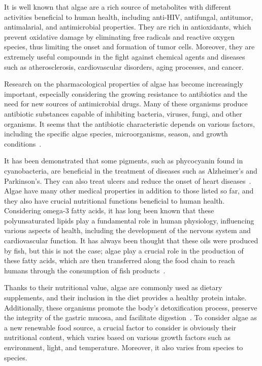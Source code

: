 It is well known that algae are a rich source of metabolites with different activities beneficial to human health, including anti-HIV, antifungal, antitumor, antimalarial, and antimicrobial properties. They are rich in antioxidants, which prevent oxidative damage by eliminating free radicals and reactive oxygen species, thus limiting the onset and formation of tumor cells. Moreover, they are extremely useful compounds in the fight against chemical agents and diseases such as atherosclerosis, cardiovascular disorders, aging processes, and cancer. 

Research on the pharmacological properties of algae has become increasingly important, especially considering the growing resistance to antibiotics and the need for new sources of antimicrobial drugs. Many of these organisms produce antibiotic substances capable of inhibiting bacteria, viruses, fungi, and other organisms. It seems that the antibiotic characteristic depends on various factors, including the specific algae species, microorganisms, season, and growth conditions~\parencite{raja_biological_2013}.

It has been demonstrated that some pigments, such as phycocyanin found in cyanobacteria, are beneficial in the treatment of diseases such as Alzheimer's and Parkinson's. They can also treat ulcers and reduce the onset of heart diseases~\parencite{subhashini_Molecular_2004}. Algae have many other medical properties in addition to those listed so far, and they also have crucial nutritional functions beneficial to human health. Considering omega-3 fatty acids, it has long been known that these polyunsaturated lipids play a fundamental role in human physiology, influencing various aspects of health, including the development of the nervous system and cardiovascular function. It has always been thought that these oils were produced by fish, but this is not the case; algae play a crucial role in the production of these fatty acids, which are then transferred along the food chain to reach humans through the consumption of fish products~\parencite{mayfield_algae_2021}.

Thanks to their nutritional value, algae are commonly used as dietary supplements, and their inclusion in the diet provides a healthy protein intake. Additionally, these organisms promote the body's detoxification process, preserve the integrity of the gastric mucosa, and facilitate digestion~\parencite{scieszka_Algae_2019}. To consider algae as a new renewable food source, a crucial factor to consider is obviously their nutritional content, which varies based on various growth factors such as environment, light, and temperature. Moreover, it also varies from species to species.

